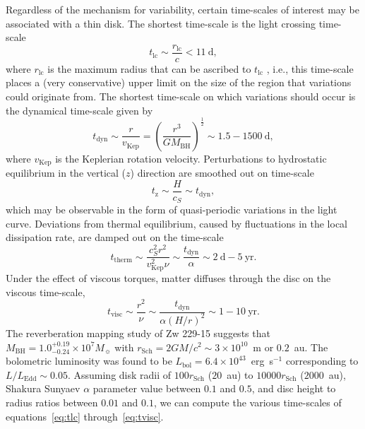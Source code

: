 \documentclass[a4paper,fleqn,usenatbib]{mnras}
\begin{document}
Regardless of the mechanism for variability, certain time-scales of interest may be associated with a thin disk. The shortest time-scale is the light crossing time-scale
\begin{equation}\label{eq:tlc}
t_{\mathrm{lc}} \sim \frac{r_{\mathrm{lc}}}{c} < 11~\text{d},
\end{equation}
where $r_{\mathrm{lc}}$ is the maximum radius that can be ascribed to $t_{\mathrm{lc}}$ \citep{Peterson}, i.e., this time-scale places a (very conservative) upper limit on the size of the region that variations could originate from. The shortest time-scale on which variations should occur is the dynamical time-scale given by
\begin{equation}\label{eq:tdyn}
t_{\mathrm{dyn}} \sim \frac{r}{v_{\mathrm{Kep}}} = \left( \frac{r^{3}}{GM_{\mathrm{BH}}} \right)^{\frac{1}{2}} \sim 1.5 - 1500~\text{d},
\end{equation}
where $v_{\mathrm{Kep}}$ is the Keplerian rotation velocity. Perturbations to hydrostatic equilibrium in the vertical ($z$) direction are smoothed out on time-scale
\begin{equation}\label{eq:tz}
t_{\mathrm{z}} \sim \frac{H}{c_{S}} \sim t_{\mathrm{dyn}},
\end{equation}
which may be observable in the form of quasi-periodic variations in the light curve. Deviations from thermal equilibrium, caused by fluctuations in the local dissipation rate, are damped out on the time-scale
\begin{equation}\label{eq:ttherm}
t_{\mathrm{therm}} \sim \frac{c_{S}^{2}r^{2}}{v_{\mathrm{Kep}}^{2} \nu} \sim \frac{t_{\mathrm{dyn}}}{\alpha}  \sim 2~\text{d} - 5~\text{yr}.
\end{equation}
Under the effect of viscous torques, matter diffuses through the disc on the viscous time-scale,
\begin{equation}\label{eq:tvisc}
t_{\mathrm{visc}} \sim \frac{r^{2}}{\nu} \sim \frac{t_{\mathrm{dyn}}}{\alpha (H/r)^{2}} \sim 1 - 10~\text{yr}.
\end{equation}
The \citet{Barth11} reverberation mapping study of Zw 229-15 suggests that $M_{\mathrm{BH}} = 1.0^{+0.19}_{-0.24} \times 10^{7} M_{\sun}$ with $r_{\mathrm{Sch}} = 2GM/c^{2} \sim 3 \times 10^{10}$~m or $0.2$~au. The bolometric luminosity was found to be $L_{\mathrm{bol}} = 6.4 \times 10^{43}$~erg~s$^{-1}$ corresponding to $L / L_{\mathrm{Edd}} \sim 0.05$. Assuming disk radii of $100 r_{\mathrm{Sch}}$ ($20$~au) to $10000 r_{\mathrm{{Sch}}}$ ($2000$~au), Shakura Sunyaev $\alpha$ parameter value between $0.1$ and $0.5$, and disc height to radius ratios between $0.01$ and $0.1$, we can compute the various time-scales of equations~\eqref{eq:tlc} through~\eqref{eq:tvisc}.
\end{document}
